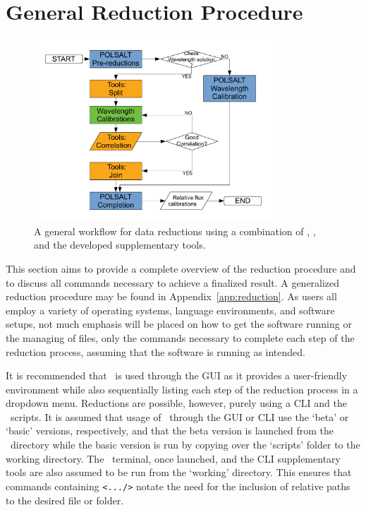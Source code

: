 \section{General Reduction Procedure}\label{sec:red_proc}

\begin{figure}[t]
    \centering
    \includegraphics[width = 0.8\textwidth]{figures/3_new_workflow.pdf}
    \caption{A general workflow for data reductions using a combination of \polsalt, \iraf, and the developed supplementary tools.}
    \label{fig:new_workflow}
\end{figure}

This section aims to provide a complete overview of the reduction procedure and to discuss all commands necessary to achieve a finalized result. A generalized reduction procedure may be found in Appendix~\ref{app:reduction}. As users all employ a variety of operating systems, language environments, and software setups, not much emphasis will be placed on how to get the software running or the managing of files, only the commands necessary to complete each step of the reduction process, assuming that the software is running as intended.

It is recommended that \polsalt\ is used through the \gls{GUI} as it provides a user-friendly environment while also sequentially listing each step of the reduction process in a dropdown menu. Reductions are possible, however, purely using a \gls{CLI} and the \polsalt\ scripts. It is assumed that usage of \polsalt\ through the \gls{GUI} or \gls{CLI} use the `beta' or `basic' versions, respectively, and that the beta version is launched from the \polsalt\ directory while the basic version is run by copying over the `scripts' folder to the working directory. The \iraf\ terminal, once launched, and the \gls{CLI} supplementary tools are also assumed to be run from the `working' directory. This ensures that commands containing \texttt{<.../>} notate the need for the inclusion of relative paths to the desired file or folder.

